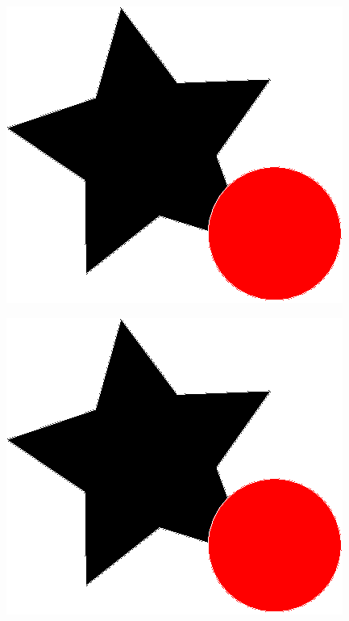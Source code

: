 \documentclass{article}
\begin{document}
\includegraphics{drawing.eps}
\graphicspath{{fig/}}
\includegraphics{drawing2.eps}
\end{document}
